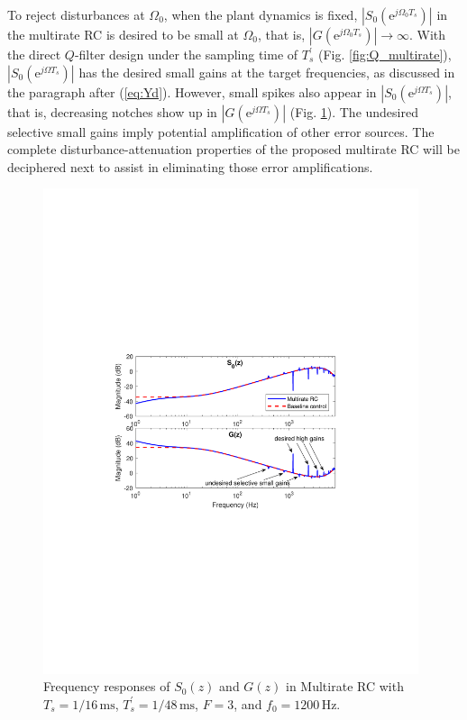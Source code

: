 \documentclass [11pt, proquest] {uwthesis}[2020/02/24]
\begin{document}
To reject disturbances at $\Omega_{0}$, when the plant dynamics
is fixed, $|S_{0}(\text{e}^{j\Omega_{0}T_{s}})|$ in the multirate
RC is desired to be small at $\Omega_{0}$, that is, $|G(\text{e}^{j\Omega_{0}T_{s}})|\rightarrow\infty$.
With the direct $Q$-filter design under the sampling time of $T_{s}^{'}$
(Fig. \ref{fig:Q_multirate}), $|S_{0}(\text{e}^{j\Omega T_{s}})|$
has the desired small gains at the target frequencies, as discussed
in the paragraph after (\ref{eq:Yd}). However, small spikes also
appear in $|S_{0}(\text{e}^{j\Omega T_{s}})|$, that is, decreasing
notches show up in $|G(\text{e}^{j\Omega T_{s}})|$ (Fig. \ref{fig:Sensitivity_func}).
The undesired selective small gains imply potential amplification
of other error sources. The complete disturbance-attenuation properties
of the proposed multirate RC will be deciphered next to assist in
eliminating those error amplifications.
\begin{figure}[!ht]
\begin{centering}
\includegraphics[width=11cm]{Fractional-order-RC/sensitivity_func_G_normalized}
\par\end{centering}
\caption{\label{fig:Sensitivity_func}Frequency responses of $S_{0}(z)$ and
$G(z)$ in Multirate RC with $T_{s}=1/16\,\text{ms}$, $T_{s}^{'}=1/48\,\text{ms}$,
$F=3$, and $f_{0}=1200\,\text{Hz}$. }
\end{figure}
\end{document}
